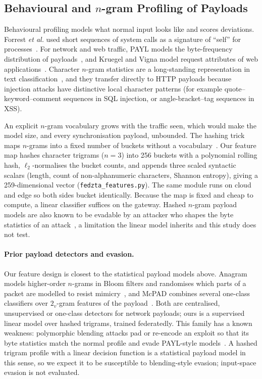 \subsection{Behavioural and \texorpdfstring{$n$}{n}-gram Profiling of Payloads}
Behavioural profiling models what normal input looks like and scores deviations. Forrest \textit{et al.} used short sequences of system calls as a signature of ``self'' for processes~\cite{forrest1996}. For network and web traffic, PAYL models the byte-frequency distribution of payloads~\cite{wang2004payl}, and Kruegel and Vigna model request attributes of web applications~\cite{kruegel2003}. Character $n$-gram statistics are a long-standing representation in text classification~\cite{cavnar1994}, and they transfer directly to HTTP payloads because injection attacks have distinctive local character patterns (for example quote--keyword--comment sequences in SQL injection, or angle-bracket--tag sequences in XSS).

An explicit $n$-gram vocabulary grows with the traffic seen, which would make the model size, and every synchronisation payload, unbounded. The hashing trick maps $n$-grams into a fixed number of buckets without a vocabulary~\cite{weinberger2009}. Our feature map hashes character trigrams ($n=3$) into 256 buckets with a polynomial rolling hash, $\ell_2$-normalises the bucket counts, and appends three scaled syntactic scalars (length, count of non-alphanumeric characters, Shannon entropy), giving a 259-dimensional vector (\texttt{fedzta\_features.py}). The same module runs on cloud and edge so both sides bucket identically. Because the map is fixed and cheap to compute, a linear classifier suffices on the gateway. Hashed $n$-gram payload models are also known to be evadable by an attacker who shapes the byte statistics of an attack~\cite{fogla2006}, a limitation the linear model inherits and this study does not test.

\paragraph{Prior payload detectors and evasion.}
Our feature design is closest to the statistical payload models above. Anagram models higher-order $n$-grams in Bloom filters and randomises which parts of a packet are modelled to resist mimicry~\cite{wang2006anagram}, and McPAD combines several one-class classifiers over $2_v$-gram features of the payload~\cite{perdisci2009mcpad}. Both are centralised, unsupervised or one-class detectors for network payloads; ours is a supervised linear model over hashed trigrams, trained federatedly. This family has a known weakness: polymorphic blending attacks pad or re-encode an exploit so that its byte statistics match the normal profile and evade PAYL-style models~\cite{fogla2006pba}. A hashed trigram profile with a linear decision function is a statistical payload model in this sense, so we expect it to be susceptible to blending-style evasion; input-space evasion is not evaluated.

